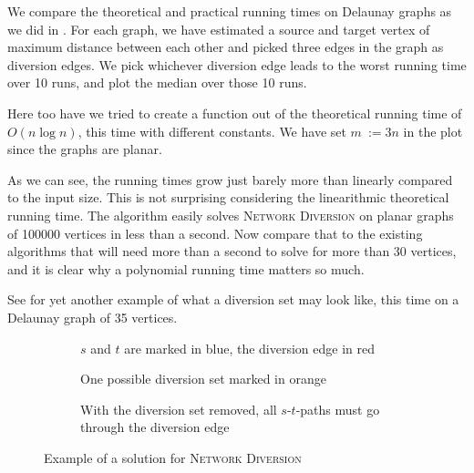 We compare the theoretical and practical running times on Delaunay graphs as we did in . For each graph, we have estimated a source and target vertex of maximum distance between each other and picked three edges in the graph as diversion edges. We pick whichever diversion edge leads to the worst running time over 10 runs, and plot the median over those 10 runs.

Here too have we tried to create a function out of the theoretical running time of $O(n \log n)$, this time with different constants. We have set $m~:= 3n$ in the plot since the graphs are planar.

\begin{center}
        
\end{center}

As we can see, the running times grow just barely more than linearly compared to the input size. This is not surprising considering the linearithmic theoretical running time. The algorithm easily solves \textsc{Network Diversion} on planar graphs of 100000 vertices in less than a second. Now compare that to the existing algorithms that will need more than a second to solve for more than 30 vertices, and it is clear why a polynomial running time matters so much.

See  for yet another example of what a diversion set may look like, this time on a Delaunay graph of 35 vertices.

\noindent
\begin{figure}
    \centering
    \begin{subfigure}{.32\textwidth}
        \centering
        
        \caption{$s$ and $t$ are marked in blue, the diversion edge in red}
        \label{subfigure:network-diversion-input}
    \end{subfigure}\hfill%
    \begin{subfigure}{.32\textwidth}
        \centering
        
        \caption{One possible diversion set marked in orange}
        \label{subfigure:network-diversion-diversion}
    \end{subfigure}\hfill%
    \begin{subfigure}{.32\textwidth}
        \centering
        
        \caption{With the diversion set removed, all $s$-$t$-paths must go through the diversion edge}
        \label{subfigure:network-diversion-diverted}
    \end{subfigure}\hfill%
    \caption{Example of a solution for \textsc{Network Diversion}}
    \label{figure:network-diversion-on-delaunay}
\end{figure}
